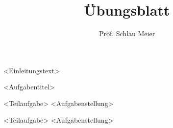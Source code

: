 \documentclass[
    inlineshortcut=java, %
    corporatedesign, %
    boxarc, %
    fop, %
]{algoexercise}
\subtitle{Prof. Schlau Meier}
\title[<Kreativer Titel>]{Übungsblatt \getSheetnumber{}}
\begin{document}
%


    \maketitle{}







    <Einleitungstext>

    \clearpage{}


    \begin{task}[points=auto]{<Aufgabentitel>}\label{ex:H1}
        \begin{subtask*}[points=1]{<Teilaufgabe>}\label{ex:H1.1}
            <Aufgabenstellung>
        \end{subtask*}
        \begin{subtask*}[points=2]{<Teilaufgabe>}\label{ex:H1.2}
            <Aufgabenstellung>
        \end{subtask*}
    \end{task}
\end{document}
